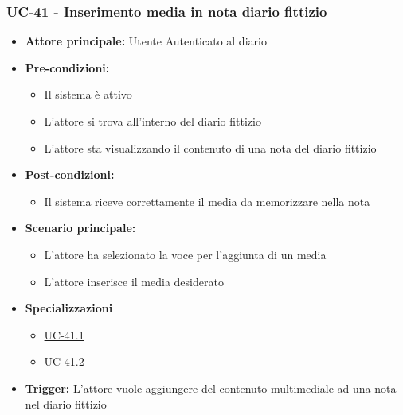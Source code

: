 \documentclass[a4paper,12pt]{article}
\begin{document}
\subsubsection{UC-41 - Inserimento media in nota diario fittizio} \label{subsec:UC-41}
\begin{itemize}
    \item \textbf{Attore principale:} Utente Autenticato al diario
    \item \textbf{Pre-condizioni:}
    \begin{itemize}
        \item Il sistema è attivo
        \item L'attore si trova all'interno del diario fittizio
        \item L'attore sta visualizzando il contenuto di una nota del diario fittizio
    \end{itemize}
    \item \textbf{Post-condizioni:}
    \begin{itemize}
        \item Il sistema riceve correttamente il media da memorizzare nella nota
    \end{itemize}
    \item \textbf{Scenario principale:}
    \begin{itemize}
        \item L'attore ha selezionato la voce per l'aggiunta di un media
        \item L'attore inserisce il media desiderato
    \end{itemize}
    \item \textbf{Specializzazioni}
    \begin{itemize}
        \item \hyperref[subsec:UC-41.1]{UC-41.1}
        \item \hyperref[subsec:UC-41.2]{UC-41.2}
    \end{itemize}
    \item \textbf{Trigger:} L'attore vuole aggiungere del contenuto multimediale ad una nota nel diario fittizio
\end{itemize}
\end{document}

